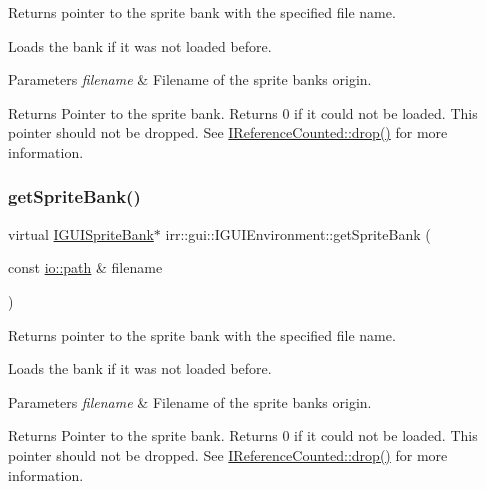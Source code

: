 Returns pointer to the sprite bank with the specified file name. 

Loads the bank if it was not loaded before. 
\begin{DoxyParams}{Parameters}
{\em filename} & Filename of the sprite bank\textquotesingle{}s origin. \\
\hline
\end{DoxyParams}
\begin{DoxyReturn}{Returns}
Pointer to the sprite bank. Returns 0 if it could not be loaded. This pointer should not be dropped. See \hyperlink{classirr_1_1IReferenceCounted_a03856a09355b89d178090c4a5f738543}{I\+Reference\+Counted\+::drop()} for more information. 
\end{DoxyReturn}
\mbox{\label{classirr_1_1gui_1_1IGUIEnvironment_a187ebb28837dbdb88810f7e493096c3f}} 
\subsubsection{\texorpdfstring{get\+Sprite\+Bank()}{getSpriteBank()}\hspace{0.1cm}{\footnotesize\ttfamily [2/2]}}
{\footnotesize\ttfamily virtual \hyperlink{classirr_1_1gui_1_1IGUISpriteBank}{I\+G\+U\+I\+Sprite\+Bank}$\ast$ irr\+::gui\+::\+I\+G\+U\+I\+Environment\+::get\+Sprite\+Bank (\begin{DoxyParamCaption}\item[{const \hyperlink{namespaceirr_1_1io_a6468281622ce3a1c46b72e19f32dded5}{io\+::path} \&}]{filename }\end{DoxyParamCaption})\hspace{0.3cm}{\ttfamily [pure virtual]}}



Returns pointer to the sprite bank with the specified file name. 

Loads the bank if it was not loaded before. 
\begin{DoxyParams}{Parameters}
{\em filename} & Filename of the sprite bank\textquotesingle{}s origin. \\
\hline
\end{DoxyParams}
\begin{DoxyReturn}{Returns}
Pointer to the sprite bank. Returns 0 if it could not be loaded. This pointer should not be dropped. See \hyperlink{classirr_1_1IReferenceCounted_a03856a09355b89d178090c4a5f738543}{I\+Reference\+Counted\+::drop()} for more information. 
\end{DoxyReturn}
\mbox{\label{classirr_1_1gui_1_1IGUIEnvironment_a48f5e442f0a2074a531234ab83148fe2}} 
